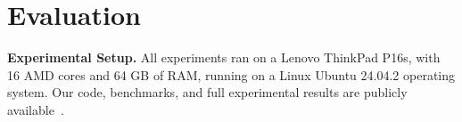 \section{Evaluation}
\label{sec:evaluation}



\noindent
\textbf{Experimental Setup.}
All experiments ran on a Lenovo ThinkPad P16s, with 16 AMD cores and 64 GB of RAM, running on a Linux Ubuntu 24.04.2 operating system.
%
%
Our code, benchmarks, and full experimental results are publicly available~\cite{ArtifactRepository}.
%
 



